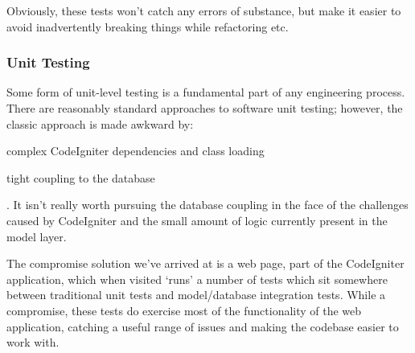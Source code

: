 Obviously, these tests won't catch any errors of substance, but make
it easier to avoid inadvertently breaking things while refactoring
etc.

\subsubsection{Unit Testing}

Some form of unit-level testing is a fundamental part of any
engineering process. There are reasonably standard approaches to
software unit testing; however, the classic approach is made awkward
by:
\begin{inparaenum}
\item complex CodeIgniter dependencies and class loading
\item tight coupling to the database
\end{inparaenum}.
It isn't really worth pursuing the database coupling in the face of
the challenges caused by CodeIgniter and the small amount of logic
currently present in the model layer.

The compromise solution we've arrived at is a web page, part of the
CodeIgniter application, which when visited `runs' a number of tests
which sit somewhere between traditional unit tests and model/database
integration tests.  While a compromise, these tests do exercise most
of the functionality of the web application, catching a useful range
of issues and making the codebase easier to work with.
